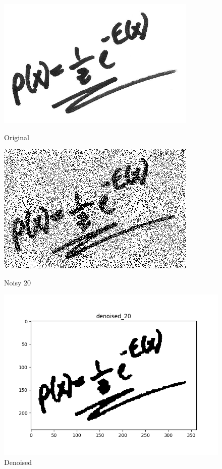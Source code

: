 \begin{figure}[!htb]
  \includegraphics[width=\linewidth]{pa4/orig.png}
  \caption{Original}\label{fig:awesome_image1}
\endminipage\hfill
{}
  \includegraphics[width=\linewidth]{pa4/noisy_20.png}
  \caption{Noisy 20}\label{fig:awesome_image2}
\endminipage\hfill
{}%
  \includegraphics[width=\linewidth]{pa4/denoised_20.png}
  \caption{Denoised}\label{fig:awesome_image3}
\endminipage
\end{figure}

